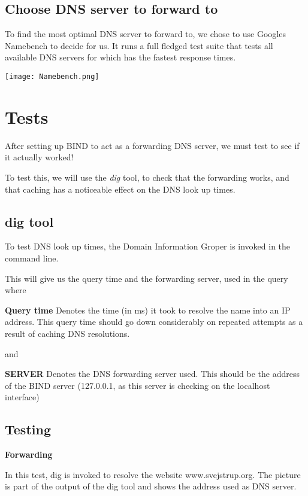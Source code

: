 \subsection{Choose DNS server to forward to}
To find the most optimal DNS server to forward to, we chose to use Googles Namebench to decide for us. It runs a full fledged test suite that tests all available DNS servers for which has the fastest response times.  

\begin{center}
	\texttt{[image: Namebench.png]}
\end{center}

\section{Tests}
After setting up BIND to act as a forwarding DNS server, we must test to see if it actually worked!

To test this, we will use the \textit{dig} tool, to check that the forwarding works, and that caching has a noticeable effect on the DNS look up times. 
\subsection{dig tool}
To test DNS look up times, the Domain Information Groper is invoked in the command line.

This will give us the query time and the forwarding server, used in the query where

\textbf{Query time}
Denotes the time (in ms) it took to resolve the name into an IP address.
This query time should go down considerably on repeated attempts as a result of caching DNS resolutions.

and

\textbf{SERVER}
Denotes the DNS forwarding server used. This should be the address of the BIND server (127.0.0.1, as this server is checking on the localhost interface)

\subsection{Testing}
\textbf{Forwarding}

In this test, dig is invoked to resolve the website www.svejstrup.org. 
The picture is part of the output of the dig tool and shows the address used as DNS server.

